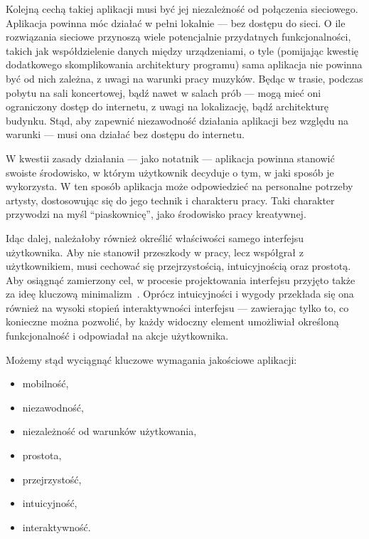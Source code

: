 Kolejną cechą takiej aplikacji musi być jej niezależność od połączenia sieciowego.
Aplikacja powinna móc działać w pełni lokalnie — bez dostępu do sieci.
O ile rozwiązania sieciowe przynoszą wiele potencjalnie przydatnych funkcjonalności,
takich jak współdzielenie danych między urządzeniami,
o tyle (pomijając kwestię dodatkowego skomplikowania architektury programu)
sama aplikacja nie powinna być od nich zależna, z uwagi na warunki pracy muzyków.
Będąc w trasie, podczas pobytu na sali koncertowej, bądź nawet w salach prób — mogą mieć oni ograniczony dostęp do internetu,
z uwagi na lokalizację, bądź architekturę budynku.
Stąd, aby zapewnić niezawodność działania aplikacji bez względu na warunki — musi ona działać bez dostępu do internetu.

W kwestii zasady działania — jako notatnik — aplikacja powinna stanowić swoiste środowisko,
w którym użytkownik decyduje o tym, w jaki sposób je wykorzysta.
W ten sposób aplikacja może odpowiedzieć na personalne potrzeby artysty, dostosowując się do jego technik i charakteru pracy.
Taki charakter przywodzi na myśl \enquote{piaskownicę}, jako środowisko pracy kreatywnej.

Idąc dalej, należałoby również określić właściwości samego interfejsu użytkownika.
Aby nie stanowił przeszkody w pracy, lecz współgrał z użytkownikiem, musi cechować się przejrzystością,
intuicyjnością oraz prostotą.
Aby osiągnąć zamierzony cel, w procesie projektowania interfejsu przyjęto także za ideę kluczową minimalizm~\cite{minimalism}.
Oprócz intuicyjności i wygody przekłada się ona również na wysoki stopień interaktywności interfejsu — zawierając tylko to,
co konieczne można pozwolić, by każdy widoczny element umożliwiał określoną funkcjonalność i odpowiadał na akcje użytkownika.

Możemy stąd wyciągnąć kluczowe wymagania jakościowe aplikacji:
\begin{itemize}
	\item mobilność,
	\item niezawodność,
	\item niezależność od warunków użytkowania,
	\item prostota,
	\item przejrzystość,
	\item intuicyjność,
	\item interaktywność.
\end{itemize}

